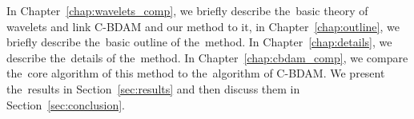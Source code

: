 In Chapter~\ref{chap:wavelets_comp}, we briefly describe the~basic theory of wavelets and link C-BDAM and our method to it, in Chapter~\ref{chap:outline}, we briefly describe the~basic outline of the~method. In Chapter~\ref{chap:details}, we describe the~details of the~method. In Chapter~\ref{chap:cbdam_comp}, we compare the~core algorithm of this method to the~algorithm of C-BDAM. We present the~results in Section~\ref{sec:results} and then discuss them in Section~\ref{sec:conclusion}.
